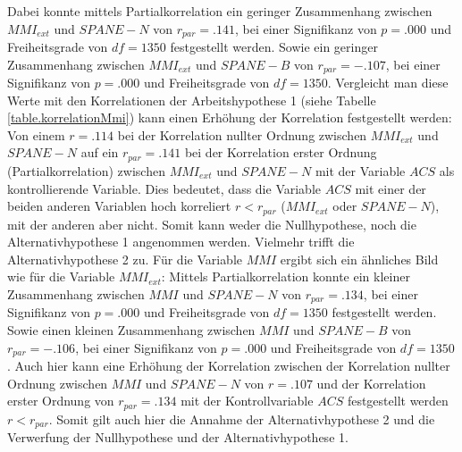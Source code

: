 Dabei konnte mittels Partialkorrelation ein geringer Zusammenhang zwischen $MMI_{ext}$ und $SPANE-N$ von $r_{par}=.141$, bei einer Signifikanz von $p=.000$ und Freiheitsgrade von $df=1350$ festgestellt werden. Sowie ein geringer Zusammenhang zwischen $MMI_{ext}$ und $SPANE-B$ von $r_{par}=-.107$, bei einer Signifikanz von $p=.000$ und Freiheitsgrade von $df=1350$. Vergleicht man diese Werte mit den Korrelationen der Arbeitshypothese 1 (siehe Tabelle \ref{table.korrelationMmi}) kann einen Erhöhung der Korrelation festgestellt werden: Von einem $r=.114$ bei der Korrelation nullter Ordnung zwischen $MMI_{ext}$ und $SPANE-N$ auf ein $r_{par}=.141$ bei der Korrelation erster Ordnung (Partialkorrelation) zwischen  $MMI_{ext}$ und $SPANE-N$ mit der Variable $ACS$ als kontrollierende Variable. Dies bedeutet, dass die Variable $ACS$ mit einer der beiden anderen Variablen hoch korreliert $r < r_{par}$ ($MMI_{ext}$ oder $SPANE-N$), mit der anderen aber nicht. Somit kann weder die Nullhypothese, noch die Alternativhypothese 1 angenommen werden. Vielmehr trifft die Alternativhypothese 2 zu. Für die Variable $MMI$ ergibt sich ein ähnliches Bild wie für die Variable $MMI_{ext}$: Mittels Partialkorrelation konnte ein kleiner Zusammenhang zwischen $MMI$ und $SPANE-N$ von $r_{par}=.134$, bei einer Signifikanz von $p=.000$ und Freiheitsgrade von $df=1350$ festgestellt werden. Sowie einen kleinen Zusammenhang zwischen $MMI$ und $SPANE-B$ von $r_{par}=-.106$, bei einer Signifikanz von $p=.000$ und Freiheitsgrade von $df=1350$. Auch hier kann eine Erhöhung der Korrelation zwischen der Korrelation nullter Ordnung zwischen $MMI$ und $SPANE-N$ von $r=.107$ und der Korrelation erster Ordnung von $r_{par}=.134$ mit der Kontrollvariable $ACS$ festgestellt werden $r < r_{par}$. Somit gilt auch hier die Annahme der Alternativhypothese 2 und die Verwerfung der Nullhypothese und der Alternativhypothese 1. 

